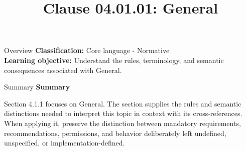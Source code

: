 \documentclass[10pt,letterpaper]{article}
\title{Clause 04.01.01: General}
\author{}
\date{}
\begin{document}
\maketitle
\begin{CornellOverviewBox}{Overview}
\textbf{Classification:} Core language - Normative\\[2pt]
\textbf{Learning objective:} Understand the rules, terminology, and semantic consequences associated with General.
\end{CornellOverviewBox}\begin{CornellSummaryBox}{Summary}
{\sffamily\bfseries\color{Accent} Summary}\par\vspace{3pt}Section 4.1.1 focuses on General. The section supplies the rules and semantic distinctions needed to interpret this topic in context with its cross-references. When applying it, preserve the distinction between mandatory requirements, recommendations, permissions, and behavior deliberately left undefined, unspecified, or implementation-defined.
\end{CornellSummaryBox}
\end{document}
